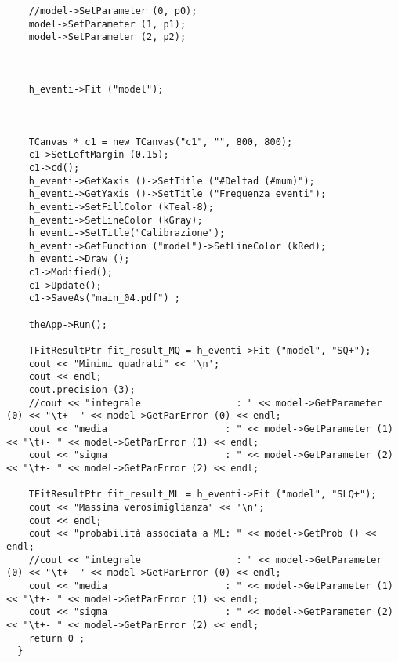 \begin{lstlisting}
    //model->SetParameter (0, p0);
    model->SetParameter (1, p1);
    model->SetParameter (2, p2);



    h_eventi->Fit ("model");



    TCanvas * c1 = new TCanvas("c1", "", 800, 800);
    c1->SetLeftMargin (0.15);
    c1->cd();
    h_eventi->GetXaxis ()->SetTitle ("#Deltad (#mum)");
    h_eventi->GetYaxis ()->SetTitle ("Frequenza eventi");
    h_eventi->SetFillColor (kTeal-8);
    h_eventi->SetLineColor (kGray);
    h_eventi->SetTitle("Calibrazione");
    h_eventi->GetFunction ("model")->SetLineColor (kRed);
    h_eventi->Draw ();
    c1->Modified();
    c1->Update();
    c1->SaveAs("main_04.pdf") ;

    theApp->Run();

    TFitResultPtr fit_result_MQ = h_eventi->Fit ("model", "SQ+");
    cout << "Minimi quadrati" << '\n';
    cout << endl;
    cout.precision (3);
    //cout << "integrale                 : " << model->GetParameter (0) << "\t+- " << model->GetParError (0) << endl;
    cout << "media                     : " << model->GetParameter (1) << "\t+- " << model->GetParError (1) << endl;
    cout << "sigma                     : " << model->GetParameter (2) << "\t+- " << model->GetParError (2) << endl;

    TFitResultPtr fit_result_ML = h_eventi->Fit ("model", "SLQ+");
    cout << "Massima verosimiglianza" << '\n';
    cout << endl;
    cout << "probabilità associata a ML: " << model->GetProb () << endl;
    //cout << "integrale                 : " << model->GetParameter (0) << "\t+- " << model->GetParError (0) << endl;
    cout << "media                     : " << model->GetParameter (1) << "\t+- " << model->GetParError (1) << endl;
    cout << "sigma                     : " << model->GetParameter (2) << "\t+- " << model->GetParError (2) << endl;
    return 0 ;
  }

\end{lstlisting}